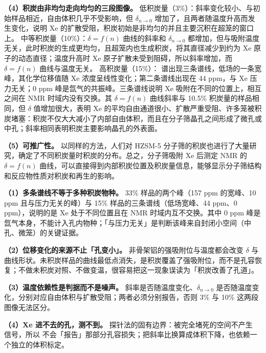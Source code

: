 \begin{dataflow}
\textbf{（4）积炭由非均匀走向均匀的三段图像。}
低积炭量（3\%）：斜率变化较小、与初始样品相近，自由体积几乎不受影响，但 $\delta_{n\to 0}$ 增加了，且两者随温度升高而发生变化，说明 Xe 的扩散受阻，积炭初始是非均匀的并且主要沉积在超笼的窗口上。
中等积炭量（10\%）：$\delta=f(n)$ 曲线的斜率和 $\delta_{n\to 0}$ 都增加，但与吸附温度无关，此时积炭的生成更均匀，且超笼内也生成积炭，将其直径减少到约为 Xe 原子的动态直径；温度升高时 Xe 原子扩散未受到阻碍，所以斜率增加，而 $\delta=f(n)$ 曲线与温度无关。
高积炭量（15\%）： 谱出现三条谱线，低场的一条宽峰，其化学位移值随 Xe 浓度呈线性变化；第二条谱线出现在 44 ppm，与 Xe 压力无关；0 ppm 峰是氙气的共振峰。三条谱线说明 Xe 吸附在不同的位置上，相互之间在 NMR 时域内没有交换。其 $\delta=f(n)$ 曲线斜率与 10.5\% 积炭量的样品相同，但 $\delta$ 值增加很大，表明 Xe 的平均自由通道很小、扩散严重受阻、许多笼被积炭堵塞：积炭不仅大大减小了内部自由体积，而且在分子筛晶孔之间形成了微孔或中孔；斜率相同表明积炭主要影响晶孔的外表面。

\textbf{（5）可推广性。} 以同样的方法，人们对 HZSM-5 分子筛的积炭也进行了大量研究，确定了不同积炭量时积炭的分布。总之，分子筛吸附 Xe 后测定  NMR 的 $\delta=f(n)$ 曲线，可以直接得到内部积炭位置及积炭量信息，能够显示分子筛结构和反应物性质对积炭和再生的影响。
\end{dataflow}

\begin{pitfall}
\textbf{（1）多条谱线不等于多种积炭物种。} 33\% 样品的两个峰（157 ppm 的宽峰、10 ppm 且与压力无关的峰）与 15\% 样品的三条谱线（低场宽峰、44 ppm、0 ppm），说明的是 Xe 处于不同位置且在 NMR 时域内互不交换。其中 0 ppm 峰是氙气本身，不能计入孔内物种；「与压力无关」是判断该峰来自封闭小空间（中孔、微笼）的关键证据。

\textbf{（2）位移变化的来源不止「孔变小」。} 非骨架铝的强吸附位与温度都会改变 $\delta$ 与曲线形状。未积炭样品的曲线最低点消失，是积炭覆盖了强吸附位，而不是孔容恢复；不做未积炭对照、不做变温，很容易把这一现象误读为「积炭改善了孔道」。

\textbf{（3）温度依赖性是判据而不是噪声。} 斜率是否随温度变化、$\delta_{n\to 0}$ 是否随温度变化，分别对应自由体积与扩散受阻；两者必须分别报告，否则 3\% 与 10\% 这两段图像无法区分。

\textbf{（4）Xe 进不去的孔，测不到。} 探针法的固有边界：被完全堵死的空间不产生  信号，所以  不会「报告」那部分孔容损失；把斜率比换算成体积下降，也依赖一个独立的体积标定。
\end{pitfall}

